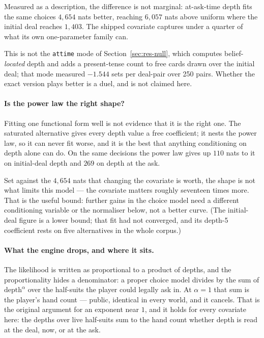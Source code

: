\documentclass[11pt,letterpaper]{article}
\begin{document}
Measured as a description, the difference is not marginal: at-ask-time depth
fits the same choices $4{,}654$ nats better, reaching $6{,}057$ nats above
uniform where the initial deal reaches $1{,}403$. The shipped covariate captures
under a quarter of what its own one-parameter family can.

This is not the \texttt{attime} mode of Section~\ref{sec:res-null}, which
computes belief-\emph{located} depth and adds a present-tense count to free cards
drawn over the initial deal; that mode measured $-1.544$ sets per deal-pair over
250 pairs. Whether the exact version plays better is a duel, and is not claimed
here.

\paragraph{Is the power law the right shape?} Fitting one functional form well
is not evidence that it is the right one. The saturated alternative gives every
depth value a free coefficient; it nests the power law, so it can never fit
worse, and it is the best that anything conditioning on depth alone can do. On
the same decisions the power law gives up $110$ nats to it on initial-deal depth
and $269$ on depth at the ask.

Set against the $4{,}654$ nats that changing the covariate is worth, the shape is
not what limits this model --- the covariate matters roughly seventeen times
more. That is the useful bound: further gains in the choice model need a
different conditioning variable or the normaliser below, not a better curve.
(The initial-deal figure is a lower bound; that fit had not converged, and its
depth-5 coefficient rests on five alternatives in the whole corpus.)

\paragraph{What the engine drops, and where it sits.} The likelihood is written
as proportional to a product of depths, and the proportionality hides a
denominator: a proper choice model divides by the sum of $\text{depth}^\alpha$
over the half-suits the player could legally ask in. At $\alpha = 1$ that sum is
the player's hand count --- public, identical in every world, and it cancels.
That is the original argument for an exponent near $1$, and it holds for every
covariate here: the depths over live half-suits sum to the hand count whether
depth is read at the deal, now, or at the ask.
\end{document}
